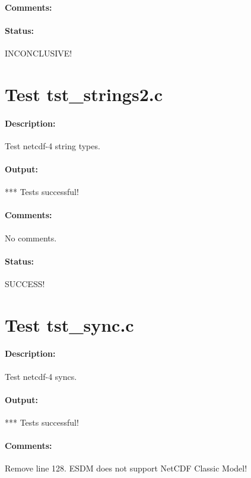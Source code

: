 \paragraph{Comments:}

\paragraph{Status:} INCONCLUSIVE!

{\color{blue}{Help, Julian!}}

\section{Test tst\_strings2.c}

\paragraph{Description:} Test netcdf-4 string types.

\paragraph{Output:} *** Tests successful!

\paragraph{Comments:} No comments.

\paragraph{Status:} SUCCESS!

\section{Test tst\_sync.c}

\paragraph{Description:} Test netcdf-4 syncs.

\paragraph{Output:} *** Tests successful!

\paragraph{Comments:} Remove line 128. ESDM does not support NetCDF Classic Model!

